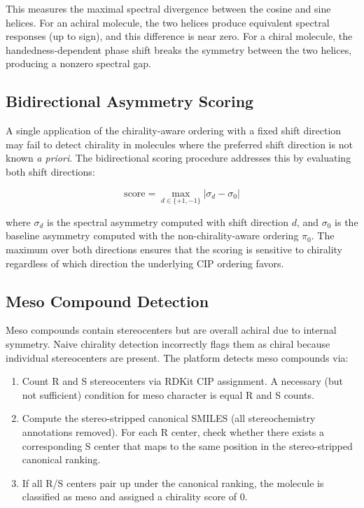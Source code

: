 \documentclass[11pt,a4paper]{article}
\begin{document}
This measures the maximal spectral divergence between the cosine and sine helices.
For an achiral molecule, the two helices produce equivalent spectral responses
(up to sign), and this difference is near zero. For a chiral molecule, the
handedness-dependent phase shift breaks the symmetry between the two helices,
producing a nonzero spectral gap.

\subsection{Bidirectional Asymmetry Scoring}

A single application of the chirality-aware ordering with a fixed shift direction
may fail to detect chirality in molecules where the preferred shift direction
is not known \textit{a priori}. The bidirectional scoring procedure addresses
this by evaluating both shift directions:

\begin{equation}
  \text{score} = \max_{d \in \{+1, -1\}} \left|\sigma_d - \sigma_0\right|
  \label{eq:bidirectional}
\end{equation}

where $\sigma_d$ is the spectral asymmetry computed with shift direction $d$,
and $\sigma_0$ is the baseline asymmetry computed with the non-chirality-aware
ordering $\pi_0$. The maximum over both directions ensures that the scoring
is sensitive to chirality regardless of which direction the underlying CIP
ordering favors.

\subsection{Meso Compound Detection}

Meso compounds contain stereocenters but are overall achiral due to internal
symmetry. Naive chirality detection incorrectly flags them as chiral because
individual stereocenters are present. The platform detects meso compounds via:

\begin{enumerate}[leftmargin=1.5em]
  \item Count R and S stereocenters via RDKit CIP assignment. A necessary
    (but not sufficient) condition for meso character is equal R and S counts.
  \item Compute the stereo-stripped canonical SMILES (all stereochemistry
    annotations removed). For each R center, check whether there exists a
    corresponding S center that maps to the same position in the stereo-stripped
    canonical ranking.
  \item If all R/S centers pair up under the canonical ranking, the molecule
    is classified as meso and assigned a chirality score of 0.
\end{enumerate}
\end{document}
